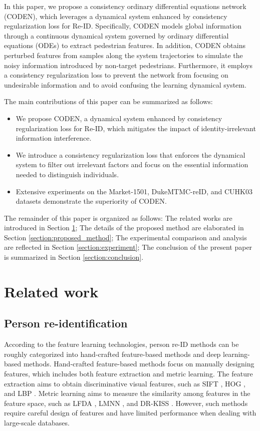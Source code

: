 \documentclass[12pt]{spieman}  %
\begin{document}
\begin{spacing}{2}
In this paper, we propose a consistency ordinary differential equations network (CODEN), which leverages a dynamical system enhanced by consistency regularization loss for Re-ID. Specifically, CODEN models global  information through a continuous dynamical system governed by ordinary differential equations (ODEs) to extract pedestrian features. In addition, CODEN obtains perturbed features from samples along the system trajectories to simulate the noisy information introduced by non-target pedestrians. Furthermore, it employs a consistency regularization loss to prevent the network from focusing on undesirable information and to avoid confusing the learning dynamical system.

The main contributions of this paper can be summarized as follows:

\begin{itemize}
	\item We propose CODEN, a dynamical system enhanced by consistency regularization loss for Re-ID, which mitigates the impact of identity-irrelevant information interference.
	\item We introduce a consistency regularization loss that enforces the dynamical system to filter out irrelevant factors and focus on the essential information needed to distinguish individuals.
	\item Extensive experiments on the Market-1501, DukeMTMC-reID, and CUHK03 datasets demonstrate the superiority of CODEN.
\end{itemize}

The remainder of this paper is organized as follows: The related works are introduced in Section \ref{section:related_work}; The details of the proposed method are elaborated in Section \ref{section:proposed_method}; The experimental comparison and analysis are reflected in Section \ref{section:experiment}; The conclusion of the present paper is summarized in Section \ref{section:conclusion}.

\section{Related work} \label{section:related_work}
\subsection{Person re-identification}
According to the feature learning technologies, person re-ID methods can be roughly categorized into hand-crafted feature-based methods and deep learning-based methods. Hand-crafted feature-based methods focus on manually designing features, which includes both feature extraction and metric learning. The feature extraction aims to obtain discriminative visual features, such as SIFT \cite{lowe2004distinctive}, HOG \cite{dalal2005histograms}, and LBP \cite{ojala2002multiresolution}. Metric learning aims to measure the similarity among features in the feature space, such as LFDA \cite{pedagadi2013local}, LMNN \cite{liao2015person}, and DR-KISS \cite{tao2016person}. However, such methods require careful design of features and have limited performance when dealing with large-scale databases.


\end{spacing}
\end{document}
